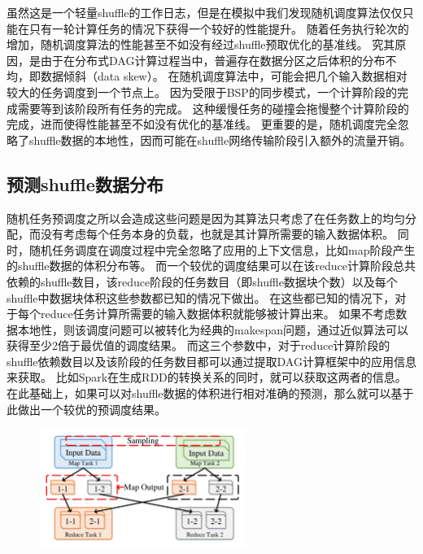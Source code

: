 虽然这是一个轻量shuffle的工作日志，但是在模拟中我们发现随机调度算法仅仅只能在只有一轮计算任务的情况下获得一个较好的性能提升。
随着任务执行轮次的增加，随机调度算法的性能甚至不如没有经过shuffle预取优化的基准线。
究其原因，是由于在分布式DAG计算过程当中，普遍存在数据分区之后体积的分布不均，即数据倾斜（data skew）\cite{reining, gufler2012load, skewtune}。
在随机调度算法中，可能会把几个输入数据相对较大的任务调度到一个节点上。
因为受限于BSP的同步模式，一个计算阶段的完成需要等到该阶段所有任务的完成。
这种缓慢任务的碰撞会拖慢整个计算阶段的完成，进而使得性能甚至不如没有优化的基准线。
更重要的是，随机调度完全忽略了shuffle数据的本地性，因而可能在shuffle网络传输阶段引入额外的流量开销。

\subsection{预测shuffle数据分布}

随机任务预调度之所以会造成这些问题是因为其算法只考虑了在任务数上的均匀分配，而没有考虑每个任务本身的负载，也就是其计算所需要的输入数据体积。
同时，随机任务调度在调度过程中完全忽略了应用的上下文信息，比如map阶段产生的shuffle数据的体积分布等。
而一个较优的调度结果可以在该reduce计算阶段总共依赖的shuffle数目，该reduce阶段的任务数目（即shuffle数据块个数）以及每个shuffle中数据块体积这些参数都已知的情况下做出。
在这些都已知的情况下，对于每个reduce任务计算所需要的输入数据体积就能够被计算出来。
如果不考虑数据本地性，则该调度问题可以被转化为经典的makespan问题，通过近似算法可以获得至少2倍于最优值的调度结果\cite{approximation}。
而这三个参数中，对于reduce计算阶段的shuffle依赖数目以及该阶段的任务数目都可以通过提取DAG计算框架中的应用信息来获取。
比如Spark在生成RDD的转换关系的同时，就可以获取这两者的信息\cite{spark}。
在此基础上，如果可以对shuffle数据的体积进行相对准确的预测，那么就可以基于此做出一个较优的预调度结果。

\begin{figure}[!htp]
	\centering
	\includegraphics[width=0.6\textwidth]{../../PPoPP-2018/fig/shuffle.pdf}
\end{figure}


